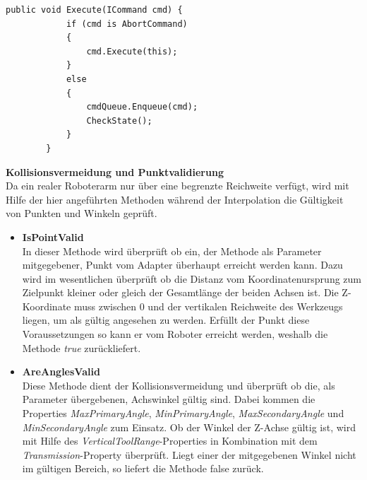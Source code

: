 \begin{lstlisting}[language = CSharp, captionpos=b, caption={Die Execute-Methode des IAdapters}]
public void Execute(ICommand cmd) {
            if (cmd is AbortCommand)
            {
                cmd.Execute(this);
            }
            else
            {
                cmdQueue.Enqueue(cmd);
                CheckState();
            }
        }
\end{lstlisting}


\textbf{Kollisionsvermeidung und Punktvalidierung}\\
Da ein realer Roboterarm nur über eine begrenzte Reichweite verfügt, wird mit Hilfe der hier angeführten Methoden während der Interpolation die Gültigkeit von Punkten und Winkeln geprüft.
\begin{itemize} 
\item \textbf{IsPointValid}\\
In dieser Methode wird überprüft ob ein, der Methode als Parameter mitgegebener, Punkt vom Adapter überhaupt erreicht werden kann. Dazu wird im wesentlichen überprüft ob die Distanz vom Koordinatenursprung zum Zielpunkt kleiner oder gleich der Gesamtlänge der beiden Achsen ist. Die Z-Koordinate muss zwischen 0 und der vertikalen Reichweite des Werkzeugs liegen, um als gültig angesehen zu werden. Erfüllt der Punkt diese Voraussetzungen so kann er vom Roboter erreicht werden, weshalb die Methode \textit{true} zurückliefert.
\item \textbf{AreAnglesValid}\\
Diese Methode dient der Kollisionsvermeidung und überprüft ob die, als Parameter übergebenen, Achswinkel  gültig sind. Dabei kommen die Properties \textit{MaxPrimaryAngle}, \textit{MinPrimaryAngle}, \textit{MaxSecondaryAngle} und \textit{MinSecondaryAngle} zum Einsatz. Ob der Winkel der Z-Achse gültig ist, wird mit Hilfe des \textit{VerticalToolRange}-Properties in Kombination mit dem \textit{Transmission}-Property überprüft. Liegt einer der mitgegebenen Winkel nicht im gültigen Bereich, so liefert die Methode false zurück.
\end{itemize}

